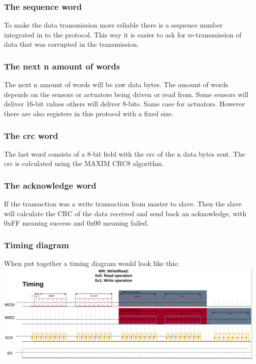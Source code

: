 \documentclass{article}
\begin{document}
\subsubsection{The sequence word}
To make the data transmission more reliable there is a sequence number integrated in to the protocol. This way it is easier to ask for re-transmission of data that was corrupted in the transmission.

\subsubsection{The next n amount of words}
The next n amount of words will be raw data bytes. The amount of words depends on the sensors or actuators being driven or read from. Some sensors will deliver 16-bit values others will deliver 8-bits. Same case for actuators. However there are also registers in this protocol with a fixed size.

\subsubsection{The crc word}
The last word consists of a 8-bit field with the crc of the n data bytes sent. The crc is calculated using the MAXIM CRC8 algorithm.

\subsubsection{The acknowledge word}
If the transaction was a write transaction from master to slave. Then the slave will calculate the CRC of the data received and send back an acknowledge, with 0xFF meaning success and 0x00 meaning failed.

\pagebreak
\subsubsection{Timing diagram}
When put together a timing diagram would look like this:\\
\includegraphics[scale=0.28]{mainboard_communication_timing_diagram.png}
\pagebreak
\end{document}
